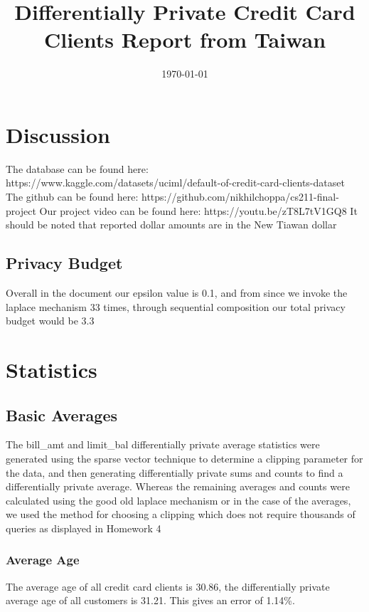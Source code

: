 \documentclass{article}%
\title{Differentially Private Credit Card Clients Report from Taiwan}%
\date{\today}%
\begin{document}
%
\normalsize%
\maketitle%
\section{Discussion}%
\label{sec:Discussion}%
The database can be found here: https://www.kaggle.com/datasets/uciml/default{-}of{-}credit{-}card{-}clients{-}dataset\newline%
%
The github can be found here: https://github.com/nikhilchoppa/cs211{-}final{-}project\newline%
%
Our project video can be found here: https://youtu.be/zT8L7tV1GQ8\newline%
%
It should be noted that reported dollar amounts are in the New Tiawan dollar%
\subsection{Privacy Budget}%
\label{subsec:PrivacyBudget}%
Overall in the document our epsilon value is 0.1, and from since we invoke the laplace mechanism 33 times, through sequential composition our total privacy budget would be 3.3

%
\section{Statistics}%
\label{sec:Statistics}%
\subsection{Basic Averages}%
\label{subsec:BasicAverages}%
The bill\_amt and limit\_bal differentially private average statistics were generated using the sparse vector technique to determine a clipping parameter for the data, and then generating differentially private sums and counts to find a differentially private average.%
Whereas the remaining averages and counts were calculated using the good old laplace mechanism or in the case of the averages, we used the method for choosing a clipping which does not require thousands of queries as displayed in Homework 4%
\subsubsection{Average Age}%
\label{ssubsec:AverageAge}%
The average age of all credit card clients is 30.86, the differentially private average age of all customers is 31.21. This gives an error of 1.14\%.
\end{document}
